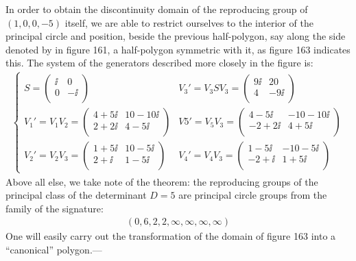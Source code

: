 In order to obtain the discontinuity domain of the reproducing group of $(1,0,0,-5)$ itself, we are able to restrict ourselves to the interior of the principal circle and position, beside the previous half-polygon, say along the side denoted by  in figure 161, a half-polygon symmetric with it, as figure 163 indicates this. The system of the generators described more closely in the figure is:
\begin{align}
    \left\{\begin{array}{cc}
    S=\left(\begin{array}{cc}
    \ii & 0\\
    0 & -\ii\\
    \end{array}\right) & 
    V_3'= V_3SV_3=\left(\begin{array}{cc}
    9\ii & 20\\
    4 & -9\ii\\
    \end{array}\right)
    \\
    V_1'=V_1V_2=\left(\begin{array}{cc}
    4+5\ii & 10-10\ii\\
    2+2\ii & 4-5\ii\\
    \end{array}\right) & 
    V5'= V_ 5V_3=\left(\begin{array}{cc}
    4-5\ii & -10-10\ii\\
    -2+2\ii & 4+5\ii\\
    \end{array}\right)
    \\
    V_2'=V_2V_3=\left(\begin{array}{cc}
    1+5\ii & 10-5\ii\\
    2+\ii & 1-5\ii\\
    \end{array}\right) &
    V_4'= V_4V_3=\left(\begin{array}{cc}
    1-5\ii & -10-5\ii\\
    -2+\ii & 1+5\ii\\
    \end{array}\right)
    \end{array}\right.
\end{align}
Above all else, we take note of the theorem: the reproducing groups of the principal class of the determinant $D=5$ are principal circle groups from the family of the signature:
\begin{align}
    (0,6,2,2,\infty,\infty,\infty,\infty)
\end{align}
One will easily carry out the transformation of the domain of figure 163 into a “canonical” polygon.---

